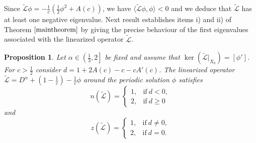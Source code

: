 \documentclass[12pt,reqno]{amsart}
\newcommand{\2}{L^2_{per}(0, T)}
\newtheorem{prop}{Proposition}[section]
\numberwithin{equation}{section}
\numberwithin{figure}{section}
\begin{document}
Since $\mathcal{\tilde{L}}\phi= -\frac{1}{c}\left(\frac{1}{2}\phi^2 + A(c) \right)$, we have $\langle \mathcal{\tilde{L}}\phi, \phi \rangle <0$ and we deduce that $\mathcal{\tilde{L}}$ has at least one negative eigenvalue. Next result establishes items i) and ii) of Theorem $\ref{maintheorem}$ by giving the precise behaviour of the first eigenvalues associated with the linearized operator $\mathcal{\tilde{L}}$.

\begin{prop}\label{propL}
	Let $\alpha\in\left(\frac{1}{3},2\right]$ be fixed and assume that $\ker(\mathcal{\tilde{L}}|_{X_0})=[\phi']$. For $c>\frac{1}{2}$ consider $d=1 +2A(c) -c -cA'(c)$. The linearized operator $\mathcal{\tilde{L}}= D^{\alpha}+ (1 - \frac{1}{c}) - \frac{1}{c}\phi$ around the periodic solution $\phi$ satisfies
	\begin{equation}\label{propr1}
	\displaystyle n(\mathcal{\tilde{L}}) = \left\{ \begin{array}{ll} 1, &
	\textrm{if} \  d < 0,\\
	2, & \textrm{if} \ d\geq0
	\end{array}\right.
	\end{equation}
	and
		\begin{equation}\label{propr2}
	\displaystyle z(\mathcal{\tilde{L}}) = \left\{ \begin{array}{ll} 1, &
	\textrm{if} \  d \neq 0,\\
	2, & \textrm{if} \ d=0.
	\end{array}\right.
	\end{equation}
\end{prop}
\end{document}
